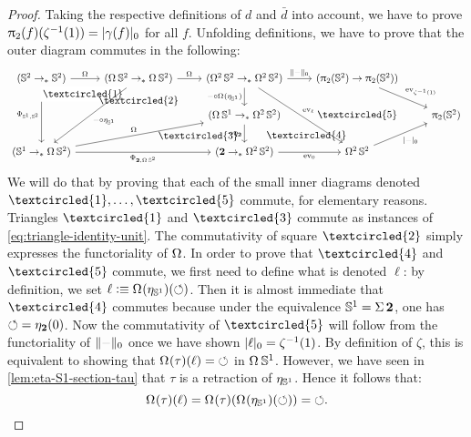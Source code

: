 \documentclass[english,a4]{article}
\newcommand{\ptdto}{\to_\ast}%
\newcommand{\setTrunc}[1]{\Trunc{#1}_0}
\newcommand{\settrunc}[1]{\trunc{#1}_0}
\begin{document}
\begin{proof}
  Taking the respective definitions of $d$ and $\bar d$ into account,
  we have to prove $\hgr 2 (f)({\inv\zeta(1)})= \settrunc {\gamma(f)}$ for all $f$.
  Unfolding definitions, 
  we have to prove that the outer diagram commutes in the following:
  \begin{displaymath}
    \begin{tikzcd}
      (\Sp \ptdto \Sp) \ar[r,"\loopspace\null"] \ar[dd,"\Phi_{\Sc,\Sp}"{swap}]
      \drar[phantom,"\textcircled{\small 1}"{description, near start}] 
      & (\loopspace \null \Sp \ptdto \loopspace\null\Sp) \ar[r,"\loopspace\null"] \ar[ddl,"\blank\circ\eta_{\Sc}"] 
      \dar["\textcircled{\small 2}", phantom]
      & (\loopspace 2 \Sp \ptdto \loopspace 2 \Sp) \ar[ddr,"\ev_\ell"] 
      \ar[r,"\setTrunc\blank"] \dar["\blank\circ \loopspace\null(\eta_{\Sc})"swap] 
      & (\hgr 2(\Sp) \to \hgr 2(\Sp)) \drar["\ev_{\inv\zeta(1)}"] \ar[dd,"\textcircled{\small 5}", phantom] &
      \\
      & {} \drar["\textcircled{\small 3}"{near end}, phantom] 
      & (\loopspace\null\Sc \ptdto \loopspace 2 \Sp) \dar["\blank\circ\eta_{\bn 2}"swap] 
      \drar["\textcircled{\small 4}", phantom] &
      & \hgr 2(\Sp)
      \\
      (\Sc \ptdto \loopspace\null\Sp) \ar[rr,"\Phi_{\bn 2,\loopspace\null\Sp}"swap] \ar[urr,"\loopspace\null"] & 
      & (\bn 2 \ptdto \loopspace 2 \Sp) \rar["\ev_0"swap] & \loopspace 2 \Sp \urar["\settrunc\blank"swap] & 
    \end{tikzcd}
  \end{displaymath}
  We will do that by proving that each of the small inner diagrams denoted
  $\textcircled{\small 1},\dots,\textcircled{\small 5}$ commute, for elementary
  reasons. Triangles $\textcircled{\small 1}$ and $\textcircled{\small 3}$
  commute as instances of \cref{eq:triangle-identity-unit}. The commutativity
  of square $\textcircled{\small 2}$ simply expresses the functoriality of
  $\loopspace\null$. In order to prove that $\textcircled{\small 4}$ and
  $\textcircled{\small 5}$ commute, we first need to define what is denoted
  $\ell$: by definition, we set $\ell \defequi \loopspace\null
  (\eta_\Sc)(\Sloop)$.  Then it is almost immediate that $\textcircled{\small
  4}$ commutes because under the equivalence ${{\mathbb S^{1}}} = \operatorname{\Sigma} {\mathbf{2}}$, one has
  $\mathord{\circlearrowleft} = \eta_{\mathbf{2}}(0)$.  Now the commutativity of $\textcircled{\small
  5}$ will follow from the functoriality of $\setTrunc\blank$ once we have
  shown $\settrunc \ell = \inv\zeta(1)$. By definition of $\zeta$, this is
  equivalent to showing that $\loopspace\null(\tau) (\ell) = \Sloop$ in
  $\loopspace\null \Sc$. However, we have seen in \cref{lem:eta-S1-section-tau}
  that $\tau$ is a retraction of $\eta_{{{\mathbb S^{1}}}}$. Hence it follows that:
  \begin{displaymath}
    \loopspace\null(\tau)(\ell) = \loopspace\null(\tau)(\loopspace\null(\eta_\Sc)(\Sloop)) = \Sloop.
  \end{displaymath}
\end{proof}
\end{document}
